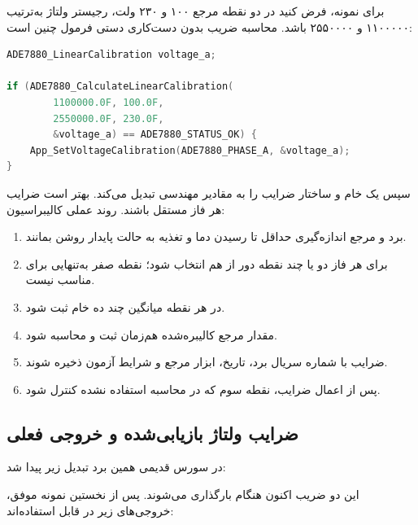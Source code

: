 \begin{center}
\end{center}

برای نمونه، فرض کنید در دو نقطه مرجع ۱۰۰ و ۲۳۰ ولت، رجیستر ولتاژ به‌ترتیب ۱۱۰۰۰۰۰ و ۲۵۵۰۰۰۰ باشد. محاسبه ضریب بدون دست‌کاری دستی فرمول چنین است:

\begin{LTR}
\begin{lstlisting}[language=C]
ADE7880_LinearCalibration voltage_a;

if (ADE7880_CalculateLinearCalibration(
        1100000.0F, 100.0F,
        2550000.0F, 230.0F,
        &voltage_a) == ADE7880_STATUS_OK) {
    App_SetVoltageCalibration(ADE7880_PHASE_A, &voltage_a);
}
\end{lstlisting}
\end{LTR}

سپس
یک  خام و ساختار ضرایب را به مقادیر مهندسی تبدیل می‌کند. بهتر است ضرایب هر فاز مستقل باشند. روند عملی کالیبراسیون:

\begin{enumerate}
  \item برد و مرجع اندازه‌گیری حداقل تا رسیدن دما و تغذیه به حالت پایدار روشن بمانند.
  \item برای هر فاز دو یا چند نقطه دور از هم انتخاب شود؛ نقطه صفر به‌تنهایی برای  مناسب نیست.
  \item در هر نقطه میانگین چند ده  خام ثبت شود.
  \item مقدار مرجع کالیبره‌شده هم‌زمان ثبت و  محاسبه شود.
  \item ضرایب با شماره سریال برد، تاریخ، ابزار مرجع و شرایط آزمون ذخیره شوند.
  \item پس از اعمال ضرایب، نقطه سوم که در محاسبه استفاده نشده کنترل شود.
\end{enumerate}

\subsection{ضرایب ولتاژ بازیابی‌شده و خروجی فعلی}
در سورس قدیمی همین برد تبدیل زیر پیدا شد:

\begin{center}

\end{center}

این دو ضریب اکنون هنگام
بارگذاری می‌شوند. پس از نخستین نمونه موفق، خروجی‌های زیر در
قابل استفاده‌اند:

